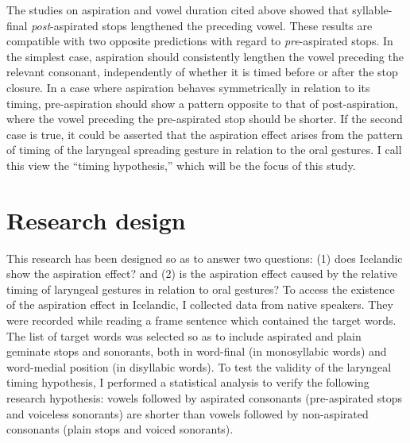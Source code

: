 \documentclass[11pt,a4paper,openany]{memoir}\usepackage[]{graphicx}\usepackage[]{color}
\begin{document}
The studies on aspiration and vowel duration cited above showed that syllable-final \textit{post}-aspirated stops lengthened the preceding vowel.
These results are compatible with two opposite predictions with regard to \textit{pre}-aspirated stops.
In the simplest case, aspiration should consistently lengthen the vowel preceding the relevant consonant, independently of whether it is timed before or after the stop closure.
In a case where aspiration behaves symmetrically in relation to its timing, pre-aspiration should show a pattern opposite to that of post-aspiration, where the vowel preceding the pre-aspirated stop should be shorter.
If the second case is true, it could be asserted that the aspiration effect arises from the pattern of timing of the laryngeal spreading gesture in relation to the oral gestures.
I call this view the ``timing hypothesis,'' which will be the focus of this study.

\section{Research design}

This research has been designed so as to answer two questions: (1) does Icelandic show the aspiration effect? and (2) is the aspiration effect caused by the relative timing of laryngeal gestures in relation to oral gestures?
To access the existence of the aspiration effect in Icelandic, I collected data from native speakers.
They were recorded while reading a frame sentence which contained the target words.
The list of target words was selected so as to include aspirated and plain geminate stops and sonorants, both in word-final (in monosyllabic words) and word-medial position (in disyllabic words).
To test the validity of the laryngeal timing hypothesis, I performed a statistical analysis to verify the following research hypothesis: vowels followed by aspirated consonants (pre-aspirated stops and voiceless sonorants) are shorter than vowels followed by non-aspirated consonants (plain stops and voiced sonorants).
\end{document}
